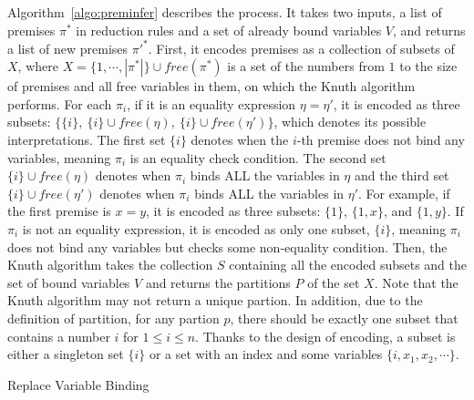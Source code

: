 Algorithm~\ref{algo:preminfer} describes the process.
It takes two inputs, a list of premises $\pi^*$ in reduction rules
and a set of already bound variables $V$, and returns a list of new premises $\pi'^*$.
First, it encodes premises as a collection of subsets of $X$,
where $X = \{1, \cdots, |\pi^*|\} \cup \mathit{free}(\pi^*)$
is a set of the numbers from $1$ to the size of premises
and all free variables in them, on which the Knuth algorithm performs.
For each $\pi_i$, if it is an equality expression $\eta = \eta'$,
it is encoded as three subsets: $\{\{i\},\ \{i\}\cup\mathit{free}(\eta),\ \{i\}\cup\mathit{free}(\eta')\}$,
which denotes its possible interpretations.
The first set $\{i\}$ denotes when the $i$-th premise does not bind any variables,
meaning $\pi_i$ is an equality check condition.
The second set $\{i\} \cup \mathit{free}(\eta)$ denotes when $\pi_i$ binds ALL the variables in $\eta$ and
the third set $\{i\} \cup \mathit{free}(\eta')$ denotes when $\pi_i$ binds ALL the variables in $\eta'$.
For example, if the first premise is $x = y$, it is encoded as three subsets: $\{1\}$, $\{1, x\}$, and $\{1, y\}$.
If $\pi_i$ is not an equality expression, it is encoded as only one subset, $\{i\}$,
meaning $\pi_i$ does not bind any variables but checks some non-equality condition.
Then, the Knuth algorithm takes the collection $S$ containing all the encoded subsets and
the set of bound variables $V$ and returns the partitions $P$ of the set $X$.
Note that the Knuth algorithm may not return a unique partion.
In addition, due to the definition of partition, for any partion $p$,
there should be exactly one subset that contains a number $i$ for $1 \le i \le n$.
Thanks to the design of encoding, a subset is either a singleton set $\{i\}$ or
a set with an index and some variables $\{i, x_1, x_2, \cdots\}$.

\begin{algorithm}[t]
\DontPrintSemicolon
{}
 {
}
\caption{Replace Variable Binding}
\label{algo:binding}
\end{algorithm}

